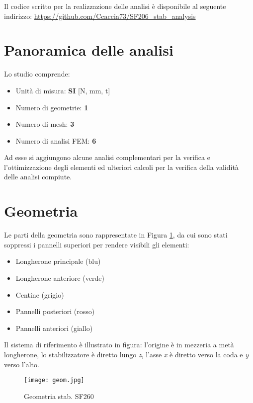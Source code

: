 \documentclass[
10pt, %
a4paper, %
oneside, %
headinclude,footinclude, %
BCOR5mm, %
]{scrartcl}
\begin{document}
Il codice scritto per la realizzazione delle analisi \`{e} disponibile al seguente indirizzo: \url{https://github.com/Ccaccia73/SF206_stab_analysis}



\section{Panoramica delle analisi}

Lo studio comprende:

\begin{itemize}
	\item Unit\`{a} di misura: \textbf{SI} [N, mm, t]
	\item Numero di geometrie: \textbf{1}
	\item Numero di mesh: \textbf{3}
	\item Numero di analisi FEM: \textbf{6}
\end{itemize}

Ad esse si aggiungono alcune analisi complementari per la verifica e l'ottimizzazione degli elementi ed ulteriori calcoli per la verifica della validit\`{a} delle analisi compiute.


\section{Geometria}

Le parti della geometria sono rappresentate in Figura \ref{fig:geom}, da cui sono stati soppressi i pannelli superiori per rendere visibili gli elementi:

\begin{itemize}
	\item Longherone principale (blu)
	\item Longherone anteriore (verde)
	\item Centine (grigio)
	\item Pannelli posteriori (rosso)
	\item Pannelli anteriori (giallo)
\end{itemize}

Il sistema di riferimento è illustrato in figura: l'origine è in mezzeria a metà longherone, lo stabilizzatore è diretto lungo \emph{z}, l'asse \emph{x} è diretto verso la coda e \emph{y} verso l'alto.

\begin{figure}[tb]
	\centering 
	\texttt{[image: geom.jpg]} 
	\caption[Geometria stabilizzatore]{Geometria stab. SF260} %
	\label{fig:geom} 
\end{figure}
\end{document}
